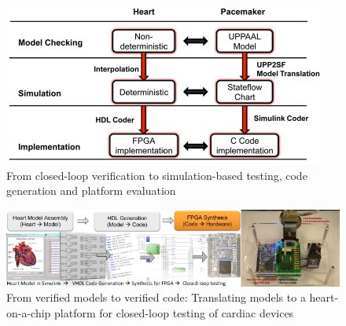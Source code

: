 \begin{figure}[!b]
	\centering
	\vspace{-20pt}
	\includegraphics[scale=1.2]{figs/model_based_b.pdf}
	\caption{\small From closed-loop verification to simulation-based testing, code generation and platform evaluation}
	\label{fig:med_overview}
\end{figure}
\begin{figure}
	\centering
	\includegraphics[scale=1.4]{figs/pvs_toolchain.pdf}
	\caption{\small From verified models to verified code: Translating models to a heart-on-a-chip platform for closed-loop testing of cardiac devices}
	\vspace{-10pt}
	\label{fig:pvs_toolchain}
\end{figure}

